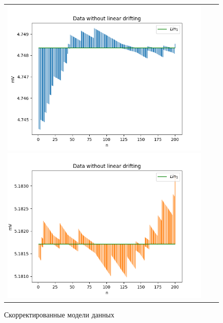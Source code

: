 \documentclass[a4paper,14pt]{article}
\begin{document}
	\begin{figure}[H]
		\begin{tabular}{ccc}
			\includegraphics[scale=0.5]{../image/fixed_PR1.png}
			\includegraphics[scale=0.5]{../image/fixed_PR2.png}
		\end{tabular}
		\caption{Скорректированные модели данных} 
	\end{figure}
	
\end{document}
